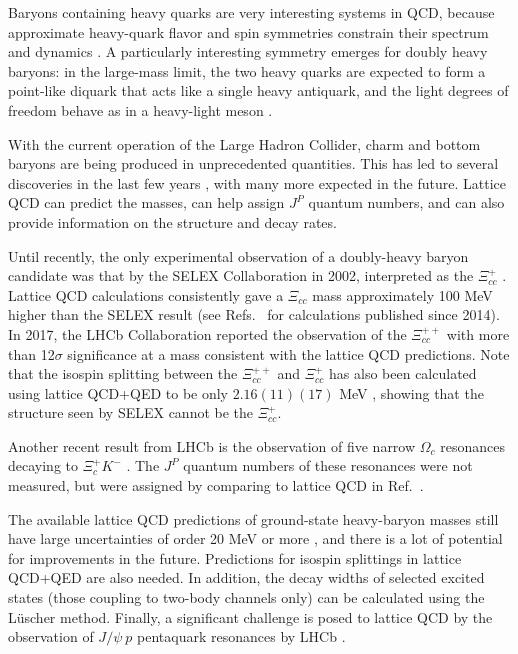 Baryons containing heavy quarks are very interesting systems in QCD, because approximate heavy-quark flavor and spin symmetries
constrain their spectrum and dynamics \cite{Korner:1994nh, Manohar:2000dt}.
A particularly interesting symmetry emerges for doubly heavy baryons: in the large-mass limit, the two heavy quarks
are expected to form a point-like diquark that acts like a single heavy antiquark, and the light degrees of freedom behave as in a
heavy-light meson \cite{Savage:1990di, Brambilla:2005yk}.

With the current operation of the Large Hadron Collider, charm and bottom baryons are being produced in unprecedented quantities.
This has led to several discoveries in the last few years \cite{Chatrchyan:2012ni, Aaij:2012da, Aaij:2014yka, Aaij:2016jnn, Aaij:2017ueg,  Aaij:2017vbw, Aaij:2017nav}, with many more expected in the future. Lattice QCD
can predict the masses, can help assign $J^P$ quantum numbers, and can also provide information on the structure and decay rates.

Until recently, the only experimental observation of a doubly-heavy baryon candidate was that by the SELEX Collaboration in 2002,
interpreted as the $\Xi_{cc}^+$ \cite{Mattson:2002vu}. Lattice QCD calculations consistently gave a $\Xi_{cc}$ mass approximately
100 MeV higher than the SELEX result (see Refs.~\cite{Brown:2014ena, Padmanath:2015jea, Bali:2015lka, Alexandrou:2017xwd} for calculations published since 2014).
In 2017, the LHCb Collaboration reported the observation of the $\Xi_{cc}^{++}$ with more than 12$\sigma$ significance \cite{Aaij:2017ueg} at a mass consistent with the lattice QCD predictions.
Note that the isospin splitting between the $\Xi_{cc}^{++}$ and $\Xi_{cc}^{+}$ has also been calculated using lattice QCD+QED to be only $2.16(11)(17)$ MeV \cite{Borsanyi:2014jba}, showing that
the structure seen by SELEX cannot be the $\Xi_{cc}^{+}$.

Another recent result from LHCb is the observation of five narrow $\Omega_c$ resonances decaying to $\Xi_c^+ K^-$ \cite{Aaij:2017nav}. The $J^P$ quantum
numbers of these resonances were not measured, but were assigned by comparing to lattice QCD in Ref.~\cite{Padmanath:2017lng}.

The available lattice QCD predictions of ground-state heavy-baryon masses still have large uncertainties of order 20 MeV or more \cite{Brown:2014ena, Padmanath:2015jea, Bali:2015lka, Alexandrou:2017xwd},
and there is a lot of potential for improvements in the future. Predictions for isospin splittings in lattice QCD+QED are also needed. In addition, the decay widths of selected excited states (those coupling to two-body channels only)
can be calculated using the L\"uscher method. Finally, a significant challenge is posed to lattice QCD by the observation of $J/\psi\: p$ pentaquark resonances by LHCb \cite{Aaij:2015tga}.


